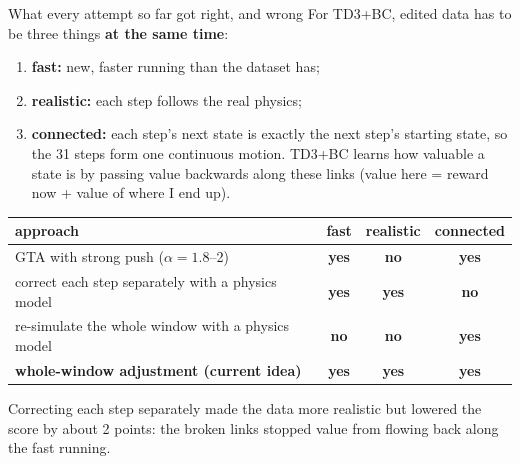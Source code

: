 \documentclass[aspectratio=169,10pt]{beamer}
\newcommand{\good}[1]{\textcolor{ok}{\textbf{#1}}}
\newcommand{\bad}[1]{\textcolor{no}{\textbf{#1}}}
\begin{document}
\begin{frame}{What every attempt so far got right, and wrong}
For TD3+BC, edited data has to be three things \textbf{at the same time}:
\begin{enumerate}
\item \textbf{fast:} new, faster running than the dataset has;
\item \textbf{realistic:} each step follows the real physics;
\item \textbf{connected:} each step's next state is exactly the next step's starting state, so the 31 steps form one continuous motion. TD3+BC learns how valuable a state is by passing value backwards along these links (value here = reward now + value of where I end up).
\end{enumerate}
\vspace{0.4em}
\centering
\begin{tabular}{lccc}
\toprule
approach & fast & realistic & connected\\
\midrule
GTA with strong push ($\alpha = 1.8$--2) & \good{yes} & \bad{no} & \good{yes}\\
correct each step separately with a physics model & \good{yes} & \good{yes} & \bad{no}\\
re-simulate the whole window with a physics model & \bad{no} & \bad{no} & \good{yes}\\
\textbf{whole-window adjustment (current idea)} & \good{yes} & \good{yes} & \good{yes}\\
\bottomrule
\end{tabular}
\vspace{0.4em}

\raggedright\small Correcting each step separately made the data more realistic but lowered the score by about 2 points: the broken links stopped value from flowing back along the fast running.
\end{frame}
\end{document}
